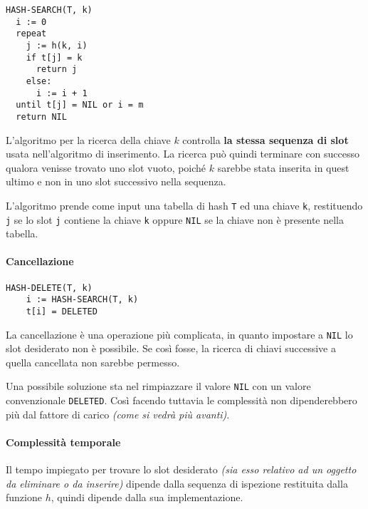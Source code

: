 \documentclass[italian, 10pt]{article}
\begin{document}
\begin{lstlisting}[style=pseudocode, caption={Pseudocodice dell'algoritmo \texttt{HASH-SEARCH}}, label={sec:ricerca-ind-aperto}]
HASH-SEARCH(T, k)
  i := 0
  repeat
    j := h(k, i)
    if t[j] = k
      return j
    else:
      i := i + 1
  until t[j] = NIL or i = m
  return NIL
\end{lstlisting}

L'algoritmo per la ricerca della chiave \(k\) controlla \textbf{la stessa sequenza di slot} usata nell'algoritmo di inserimento.
La ricerca può quindi terminare con successo qualora venisse trovato uno slot vuoto, poiché \(k\) sarebbe stata inserita in quest ultimo e non in uno slot successivo nella sequenza.

L'algoritmo prende come input una tabella di hash \texttt{T} ed una chiave \texttt{k}, restituendo \texttt{j} se lo slot \texttt{j} contiene la chiave \texttt{k} oppure \texttt{NIL} se la chiave non è presente nella tabella.

\paragraph{Cancellazione}

\begin{lstlisting}[style=pseudocode, caption={Pseudocodice dell'algoritmo \texttt{HASH-DELEETE}}, label={sec:eliminazione-ind-aperto}]
  HASH-DELETE(T, k)
    i := HASH-SEARCH(T, k)
    t[i] = DELETED
  \end{lstlisting}

La cancellazione è una operazione più complicata, in quanto impostare a \texttt{NIL} lo slot desiderato non è possibile.
Se così fosse, la ricerca di chiavi successive a quella cancellata non sarebbe permesso.

Una possibile soluzione sta nel rimpiazzare il valore \texttt{NIL} con un valore convenzionale \texttt{DELETED}.
Così facendo tuttavia le complessità non dipenderebbero più dal fattore di carico \textit{(come si vedrà più avanti)}.

\paragraph{Complessità temporale}

Il tempo impiegato per trovare lo slot desiderato \textit{(sia esso relativo ad un oggetto da eliminare o da inserire)} dipende dalla sequenza di ispezione restituita dalla funzione \(h\), quindi dipende dalla sua implementazione.
\end{document}
